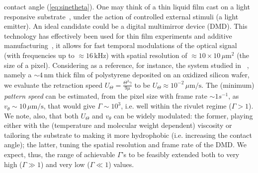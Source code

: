 contact angle (\ref{eq:sinetheta}). One may think of a thin liquid film cast on a light responsive substrate~\cite{IchimuraEtAl_Science2000}, under the action of controlled 
external stimuli (a light emitter). 
An ideal candidate could be a digital multimirror device (DMD).
This technology has effectively been used for thin film experiments and additive manufacturing~\cite{doi:10.1021/jp301092y, doi:10.1126/science.aax8760}, it allows for fast temporal modulations of the optical signal (with frequencies up to $\approx 16 \, \text{kHz}$)
with spatial resolution of $\approx 10 \times 10 \, \mu \text{m}^2$ (the size of a pixel).
Considering as a reference, for instance, the system studied in ~\cite{becker2003complex,PhysRevLett.99.114503}, namely a $\sim 4 \, \text{nm}$ thick film 
of polystyrene deposited on an oxidized silicon wafer,  
we evaluate the retraction speed 
$U_{\Theta} = \frac{\Theta^3 \gamma}{9 \mu}$ to be 
$U_{\Theta} \approx 10^{-2} \, \mu \text{m}/\text{s}$. 
The (minimum) \textit{pattern speed} can be 
estimated, from the pixel size with frame rate $\sim 1 s^{-1}$, as 
$v_{\theta} \sim 10 \, \mu \text{m}/\text{s}$, that would give $\Gamma \sim 10^3$, i.e. well within the rivulet regime ($\Gamma > 1$). We note, also, that both $U_{\Theta}$ and $v_{\theta}$ can be widely modulated: the former, playing either with the (temperature and molecular weight dependent) viscosity 
or tailoring the substrate to making it more hydrophobic (i.e. increasing the contact angle); the latter, tuning
the spatial resolution and frame rate of the DMD. We expect, thus, the range of achievable $\Gamma$'s to 
be feasibly extended both to very high ($\Gamma \gg 1$) and very low ($\Gamma \ll 1$) values.\\

